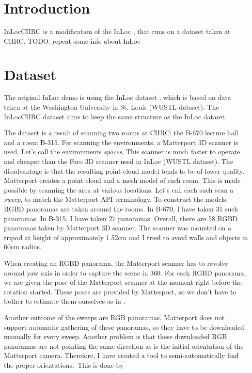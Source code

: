 \documentclass[twoside]{ctuthesis}
\theoremstyle{plain}
\theoremstyle{definition}
\theoremstyle{note}
\begin{document}
\chapter{Introduction}
InLocCIIRC is a modification of the InLoc \cite{taira2018inloc}, that runs on a dataset taken at CIIRC. TODO: repeat some info about InLoc

\chapter{Dataset}
The original InLoc demo is using the InLoc dataset \cite{taira2018inloc}, which is based on data taken at the Washington University in St. Louis (WUSTL dataset). The InLocCIIRC dataset aims to keep the same structure as the InLoc dataset.

The dataset is a result of scanning two rooms at CIIRC: the B-670 lecture hall and a room B-315. For scanning the environments, a Matterport 3D scanner is used. Let's call the environments \emph{spaces}. This scanner is much faster to operate and cheaper than the Faro 3D scanner used in InLoc (WUSTL dataset). The disadvantage is that the resulting point cloud model tends to be of lower quality. Matterport creates a point cloud and a mesh model of each room. This is made possible by scanning the area at various locations. Let's call each such scan a \emph{sweep}, to match the Matterport API terminology. To construct the models, RGBD panoramas are taken around the rooms. In B-670, I have taken 31 such panoramas. In B-315, I have taken 27 panoramas. Overall, there are 58 RGBD panoramas taken by Matterport 3D scanner. The scanner was mounted on a tripod at height of approximately 1.52cm and I tried to avoid walls and objects in 60cm radius.

When creating an RGBD panorama, the Matterport scanner has to revolve around yaw axis in order to capture the scene in 360\degree. For each RGBD panorama, we are given the pose of the Matterport scanner at the moment right before the rotation started. These poses are provided by Matterport, so we don't have to bother to estimate them ourselves as in \cite{wijmans17rgbd}.

Another outcome of the sweeps are RGB panoramas. Matterport does not support automatic gathering of these panoramas, so they have to be downloaded manually for every sweep. Another problem is that these downloaded RGB panoramas are not pointing the same direction as is the initial orientation of the Matterport camera. Therefore, I have created a tool to semi-automatically find the proper orientations. This is done by
\end{document}
